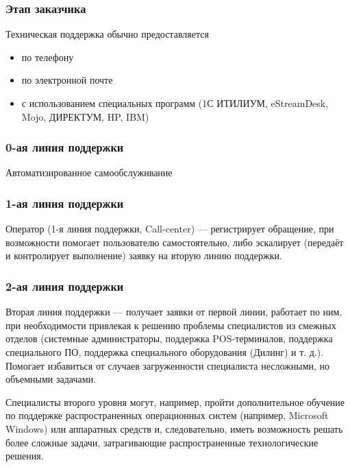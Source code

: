 \documentclass{industrial-development}
\begin{document}
\lecturenotes

\begin{frame} \frametitle{Этап заказчика}

Техническая поддержка обычно предоставляется 
	\begin{itemize}
        \item по телефону
        \item по электронной почте
        \item с использованием специальных программ (1С ИТИЛИУМ, eStreamDesk, Mojo, ДИРЕКТУМ, HP, IBM)
	\end{itemize}
\end{frame}

\lecturenotes

\begin{frame} \frametitle{0-ая линия поддержки}

    Автоматизированное самообслуживание

\end{frame}
\lecturenotes

\begin{frame} \frametitle{1-ая линия поддержки}

    Оператор (1-я линия поддержки, Call-center) — регистрирует обращение, при возможности помогает пользователю самостоятельно, либо эскалирует (передаёт и контролирует выполнение) заявку на вторую линию поддержки.

\end{frame}
\lecturenotes

\begin{frame} \frametitle{2-ая линия поддержки}

    Вторая линия поддержки — получает заявки от первой линии, работает по ним, при необходимости привлекая к решению проблемы специалистов из смежных отделов (системные администраторы, поддержка POS-терминалов, поддержка специального ПО, поддержка специального оборудования (Дилинг) и т. д.). Помогает избавиться от случаев загруженности специалиста несложными, но объемными задачами. 

\end{frame}
\lecturenotes
Специалисты второго уровня могут, например, пройти дополнительное обучение по поддержке распространенных операционных систем (например, Microsoft Windows) или аппаратных средств и, следовательно, иметь возможность решать более сложные задачи, затрагивающие распространенные технологические решения.
\end{document}
